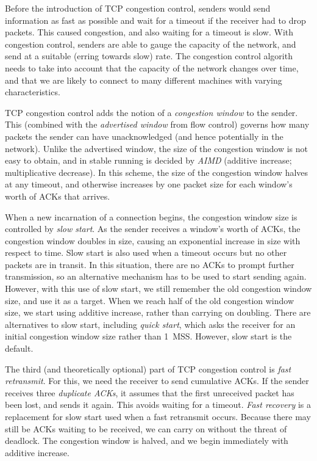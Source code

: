 \documentclass{article}
\begin{document}
Before the introduction of TCP congestion control, senders would send information as fast as possible and wait for a timeout if the receiver had to drop packets. This caused congestion, and also waiting for a timeout is slow. With congestion control, senders are able to gauge the capacity of the network, and send at a suitable (erring towards slow) rate. The congestion control algorith needs to take into account that the capacity of the network changes over time, and that we are likely to connect to many different machines with varying characteristics.

TCP congestion control adds the notion of a \textit{congestion window} to the sender. This (combined with the \textit{advertised window} from flow control) governs how many packets the sender can have unacknowledged (and hence potentially in the network). Unlike the advertised window, the size of the congestion window is not easy to obtain, and in stable running is decided by \textit{AIMD} (additive increase; multiplicative decrease). In this scheme, the size of the congestion window halves at any timeout, and otherwise increases by one packet size for each window's worth of ACKs that arrives.

When a new incarnation of a connection begins, the congestion window size is controlled by \textit{slow start}. As the sender receives a window's worth of ACKs, the congestion window doubles in size, causing an exponential increase in size with respect to time. Slow start is also used when a timeout occurs but no other packets are in transit. In this situation, there are no ACKs to prompt further transmission, so an alternative mechanism has to be used to start sending again. However, with this use of slow start, we still remember the old congestion window size, and use it as a target. When we reach half of the old congestion window size, we start using additive increase, rather than carrying on doubling. There are alternatives to slow start, including \textit{quick start}, which asks the receiver for an initial congestion window size rather than \SI{1}{MSS}. However, slow start is the default.

The third (and theoretically optional) part of TCP congestion control is \textit{fast retransmit}. For this, we need the receiver to send cumulative ACKs. If the sender receives three \textit{duplicate ACKs}, it assumes that the first unreceived packet has been lost, and sends it again. This avoids waiting for a timeout. \textit{Fast recovery} is a replacement for slow start used when a fast retransmit occurs. Because there may still be ACKs waiting to be received, we can carry on without the threat of deadlock. The congestion window is halved, and we begin immediately with additive increase.
\end{document}
